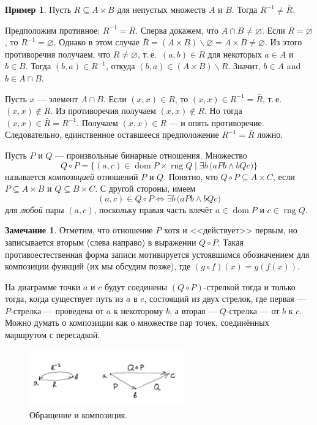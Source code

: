 \documentclass[12pt,notitlepage]{article}
\theoremstyle{plain}
\theoremstyle{definition}
\newtheorem{exm}[thm]{Пример}
\newtheorem{rem}[thm]{Замечание}
\theoremstyle{plain}
\newcommand{\sbs}{\subseteq}
\renewcommand{\setminus}{\smallsetminus}
\newcommand{\void}{\varnothing}
\newcommand{\dom}{\mathop{\mathrm{dom}}}
\newcommand{\rng}{\mathop{\mathrm{rng}}}
\newcommand{\1}{\mathbf{1}}
\newcommand{\0}{\mathbf{0}}
\begin{document}
\begin{exm}
	Пусть $R \sbs A \times B$ для непустых множеств $A$ и $B$. Тогда $R^{-1} \neq \bar R$.
	
	Предположим противное: $R^{-1} = \bar R$. Сперва докажем, что $A \cap B \neq \void$.  Если $R = \void$, то $R^{-1} = \void$. Однако в этом случае $\bar R = (A \times B) \setminus \void = A \times B \neq \void$. Из этого противоречия получаем, что $R \neq \void$, т.\,е.\ $(a,b) \in R$ для некоторых $a \in A$ и $b \in B$. Тогда $(b,a) \in R^{-1}$, откуда $(b,a) \in (A \times B) \setminus R$. Значит, $b \in A$ and $b \in A \cap B$. 
	
	Пусть $x$ --- элемент $A \cap B$. Если $(x,x) \in R$, то $(x,x) \in R^{-1} = \bar R$, т.\,е.\ $(x,x) \notin R$. Из противоречия получаем $(x,x) \notin R$. Но тогда $(x,x) \in \bar R = R^{-1}$. Получаем $(x,x) \in R$ --- и опять противоречие. Следовательно, единственное оставшееся предположение $R^{-1} = \bar R$ ложно.
\end{exm}

Пусть $P$ и $Q$ --- произвольные бинарные отношения. Множество
$$Q \circ P = \{(a, c) \in \dom P \times \rng Q \mid \exists b\, \bigl( a P b \wedge b Q c \bigr)\}$$
называется \emph{композицией} отношений $P$ и $Q$. Понятно, что $Q \circ P \sbs A \times C$, если $P \sbs A \times B$ и $Q \sbs B \times C$. С другой стороны, имеем
$$(a,c) \in Q \circ P \iff \exists b\, \bigl( a P b \wedge b Q c \bigr)$$
для \emph{любой} пары $(a, c)$, поскольку правая часть влечёт $a \in \dom P$ и $c \in \rng Q$.

\begin{rem}
	Отметим, что отношение $P$ хотя и <<действует>> первым, но записывается вторым (слева направо) в выражении $Q \circ P$. Такая противоестественная форма записи мотивируется устоявшимся обозначением для композиции функций (их мы обсудим позже), где $(g \circ f)(x) = g(f(x))$.
\end{rem}

На диаграмме точки $a$ и $c$ будут соединены $(Q \circ P)$-стрелкой тогда и только тогда, когда существует путь из $a$ в $c$, состоящий из двух стрелок, где первая --- $P$-стрелка --- проведена от $a$ к некоторому $b$, а вторая --- $Q$-стрелка --- от $b$ к $c$. Можно думать о композиции как о множестве пар точек, соединённых маршрутом с пересадкой.


\begin{figure}[h]
	\centering
	\includegraphics*[width=0.6\textwidth]{conv_comp.pdf}
	\caption{Обращение и композиция.}
\end{figure}
\end{document}
